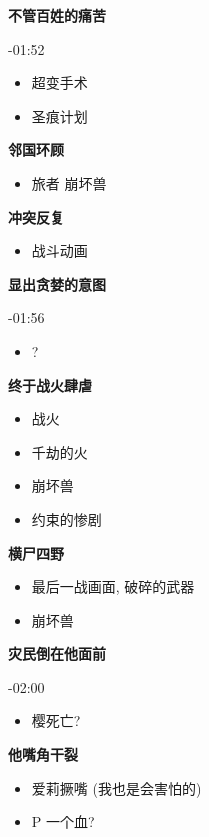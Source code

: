\documentclass[a4paper]{article}
\begin{document}
\textbf{不管百姓的痛苦}

-01:52

\begin{itemize}
    \item 超变手术
    \item 圣痕计划
\end{itemize}

\textbf{邻国环顾}

\begin{itemize}
    \item 旅者 崩坏兽
\end{itemize}

\textbf{冲突反复}

\begin{itemize}
    \item 战斗动画
\end{itemize}

\textbf{显出贪婪的意图}

-01:56

\begin{itemize}
    \item ?
\end{itemize}

\textbf{终于战火肆虐}

\begin{itemize}
    \item 战火
    \item 千劫的火
    \item 崩坏兽
    \item 约束的惨剧
\end{itemize}

\textbf{横尸四野}

\begin{itemize}
    \item 最后一战画面, 破碎的武器
    \item 崩坏兽
\end{itemize}

\textbf{灾民倒在他面前}

-02:00

\begin{itemize}
    \item 樱死亡?
\end{itemize}

\textbf{他嘴角干裂}

\begin{itemize}
    \item 爱莉撅嘴 (我也是会害怕的)
    \item P 一个血?
\end{itemize}
\end{document}
